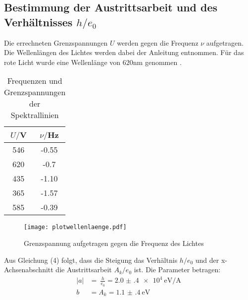 \subsection{Bestimmung der Austrittsarbeit und des Verhältnisses $h/e_0$}

Die errechneten Grenzspannungen $U$ werden gegen die Frequenz $\nu$ aufgetragen. Die Wellenlängen des Lichtes werden dabei der
Anleitung entnommen. Für das rote Licht wurde eine Wellenlänge von $620$nm genommen \cite{sample3}.


\begin{table}[H]
  \centering
  \caption{Frequenzen und Grenzspannungen der Spektrallinien}
  \label{tab:Spannungsamplitude}
  \begin{tabular}{c c}
    \toprule
    $U/$V & $\nu/$Hz \\
    \midrule
    546 &     -0.55 \\
    620 &     -0.7 \\
    435 &     -1.10 \\
    365 &     -1.57 \\
    585 &     -0.39 \\
    \bottomrule
  \end{tabular}
\end{table}



\begin{figure}[H]
  \centering
  \texttt{[image: plotwellenlaenge.pdf]}
  \caption{Grenzspannung aufgetragen gegen die Frequenz des Lichtes}
  \label{fig:plotorange}
\end{figure}


Aus Gleichung (4) folgt, dass die
 Steigung  das Verhältnis $h/e_0$ und der x-Achsenabschnitt die Austrittsarbeit $A_k/ e_0$ ist.
Die Parameter betragen:
\begin{align*}
  |a| &=\ \frac{h}{e_0}= \SI{2.0(4)e4}{\eV\per\ampere} \\
  b &= A_k = \SI{1.1(4)}{\eV}
\end{align*}
